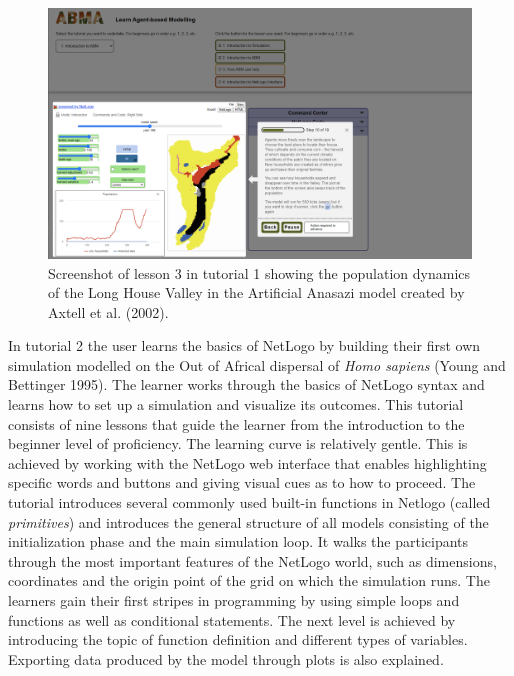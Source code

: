 \documentclass[
]{article}
\begin{document}
\begin{figure}
\includegraphics[width=1\linewidth]{figures/ScreenshotABMAtutorial1lesson3} \caption{Screenshot of lesson 3 in tutorial 1 showing the population dynamics of the Long House Valley in the Artificial Anasazi model created by Axtell et al. (2002).}\label{fig:screenshot-lesson-3}
\end{figure}

In tutorial 2 the user learns the basics of NetLogo by building their first own simulation modelled on the Out of Africal dispersal of \emph{Homo sapiens} (Young and Bettinger 1995). The learner works through the basics of NetLogo syntax and learns how to set up a simulation and visualize its outcomes. This tutorial consists of nine lessons that guide the learner from the introduction to the beginner level of proficiency. The learning curve is relatively gentle. This is achieved by working with the NetLogo web interface that enables highlighting specific words and buttons and giving visual cues as to how to proceed. The tutorial introduces several commonly used built-in functions in Netlogo (called \emph{primitives}) and introduces the general structure of all models consisting of the initialization phase and the main simulation loop. It walks the participants through the most important features of the NetLogo world, such as dimensions, coordinates and the origin point of the grid on which the simulation runs. The learners gain their first stripes in programming by using simple loops and functions as well as conditional statements. The next level is achieved by introducing the topic of function definition and different types of variables. Exporting data produced by the model through plots is also explained.
\end{document}
